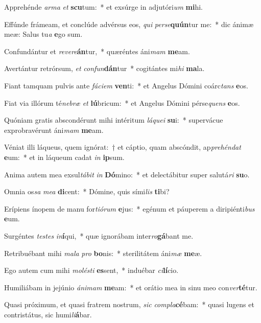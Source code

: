 \item Apprehénde \textit{ar}\textit{ma} \textit{et} \textbf{scu}tum:~* et exsúrge in adjutóri\textit{um} \textbf{mi}hi.
\item Effúnde frámeam, et conclúde advérsus eos, \textit{qui} \textit{per}\textit{se}\textbf{quún}tur me:~* dic ánimæ meæ: Salus tu\textit{a} \textbf{e}go sum.
\item Confundántur et \textit{re}\textit{ve}\textit{re}\textbf{án}tur,~* quæréntes áni\textit{mam} \textbf{me}am.
\item Avertántur retrórsum, \textit{et} \textit{con}\textit{fun}\textbf{dán}tur~* cogitántes mi\textit{hi} \textbf{ma}la.
\item Fiant tamquam pulvis ante \textit{fá}\textit{ci}\textit{em} \textbf{ven}ti:~* et Angelus Dómini coárc\textit{tans} \textbf{e}os.
\item Fiat via illórum té\textit{ne}\textit{bræ} \textit{et} \textbf{lú}bricum:~* et Angelus Dómini pérse\textit{quens} \textbf{e}os.
\item Quóniam gratis abscondérunt mihi intéritum \textit{lá}\textit{que}\textit{i} \textbf{su}i:~* supervácue exprobravérunt áni\textit{mam} \textbf{me}am.
\item Véniat illi láqueus, quem ignórat:~† et cáptio, quam abscóndit, ap\textit{pre}\textit{hén}\textit{dat} \textbf{e}um:~* et in láqueum cadat \textit{in} \textbf{ip}sum.
\item Anima autem mea exsul\textit{tá}\textit{bit} \textit{in} \textbf{Dó}mino:~* et delectábitur super salutá\textit{ri} \textbf{su}o.
\item Omnia os\textit{sa} \textit{me}\textit{a} \textbf{di}cent:~* Dómine, quis sími\textit{lis} \textbf{ti}bi?
\item Erípiens ínopem de manu for\textit{ti}\textit{ó}\textit{rum} \textbf{e}jus:~* egénum et páuperem a diripiénti\textit{bus} \textbf{e}um.
\item Surgéntes \textit{tes}\textit{tes} \textit{in}\textbf{í}qui,~* quæ ignorábam inter\textit{ro}\textbf{gá}bant me.
\item Retribuébant mihi \textit{ma}\textit{la} \textit{pro} \textbf{bo}nis:~* sterilitátem áni\textit{mæ} \textbf{me}æ.
\item Ego autem cum mihi \textit{mo}\textit{lés}\textit{ti} \textbf{es}sent,~* induébar \textit{ci}\textbf{lí}cio.
\item Humiliábam in jejúnio \textit{á}\textit{ni}\textit{mam} \textbf{me}am:~* et orátio mea in sinu meo con\textit{ver}\textbf{té}tur.
\item Quasi próximum, et quasi fratrem nostrum, \textit{sic} \textit{com}\textit{pla}\textbf{cé}bam:~* quasi lugens et contristátus, sic humi\textit{li}\textbf{á}bar.
